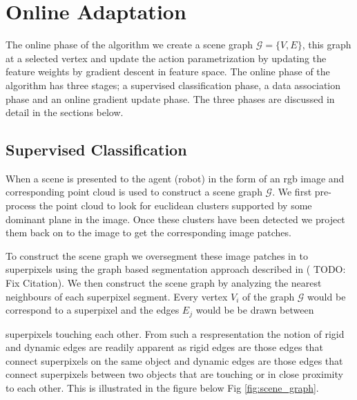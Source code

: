 \section{Online Adaptation}
\label{sec:hyp_test}
The online phase of the algorithm we create a scene graph $\mathcal{G} = \{V,E\}$, this graph at a selected vertex and update the action parametrization by updating the feature weights by gradient descent in feature space. The online phase of the algorithm has three stages; a supervised classification phase, a data association phase and an online gradient update phase. The three phases are discussed in detail in the sections below.
\subsection{Supervised Classification}
When a scene is presented to the agent (robot) in the form of an rgb image and corresponding point cloud is used to construct a scene graph $\mathcal{G}$. We first pre-process the point cloud to look for euclidean clusters supported by some dominant plane in the image. Once these clusters have been detected we project them back on to the image to get the corresponding image patches.

To construct the scene graph we oversegment these image patches in to superpixels using the graph based segmentation approach described in (\cite{Javidi12_Journal} TODO: Fix Citation). We then construct the scene graph by analyzing the nearest neighbours of each superpixel segment. Every vertex $V_i$ of the graph $\mathcal{G}$ would be correspond to a superpixel and the edges $E_j$ would be be drawn between 

superpixels touching each other. From such a respresentation the notion of rigid and dynamic edges are readily apparent as rigid edges are those edges that connect superpixels on the same object and dynamic edges are those edges that connect superpixels between two objects that are touching or in close proximity to each other. This is illustrated in the figure below Fig \ref{fig:scene_graph}.

